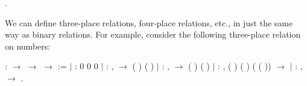 \documentclass[12pt]{report}
\begin{document}
\begin{coqdoccode}
\coqdocnoindent
{} .\coqdoceol
\end{coqdoccode}
We can define three-place relations, four-place relations,
    etc., in just the same way as binary relations.  For example,
    consider the following three-place relation on numbers: \begin{coqdoccode}
\coqdocemptyline
\coqdocnoindent
{}  :  \ensuremath{\rightarrow}  \ensuremath{\rightarrow}  \ensuremath{\rightarrow}  :=\coqdoceol
\coqdocindent{1.50em}
\ensuremath{|}  :  0 0 0 \coqdoceol
\coqdocindent{1.50em}
\ensuremath{|}  : \coqdockw{\ensuremath{\forall}}   ,     \ensuremath{\rightarrow}  ( )  ( )\coqdoceol
\coqdocindent{1.50em}
\ensuremath{|}  : \coqdockw{\ensuremath{\forall}}   ,     \ensuremath{\rightarrow}   ( ) ( )\coqdoceol
\coqdocindent{1.50em}
\ensuremath{|}  : \coqdockw{\ensuremath{\forall}}   ,  ( ) ( ) ( ( )) \ensuremath{\rightarrow}    \coqdoceol
\coqdocindent{1.50em}
\ensuremath{|}  : \coqdockw{\ensuremath{\forall}}   ,     \ensuremath{\rightarrow}    .\coqdoceol
\coqdocemptyline
\end{coqdoccode}
\end{document}
